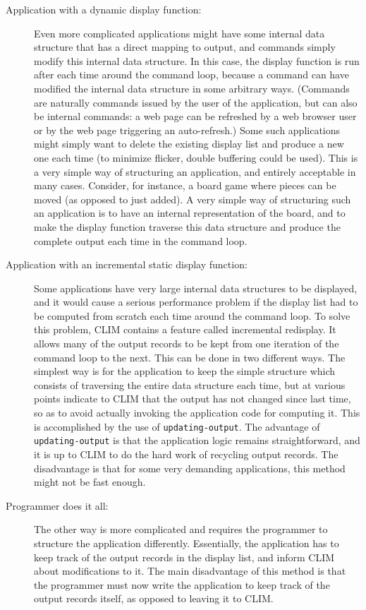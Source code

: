 \begin{description}
  \item[Application with a dynamic display function:] Even more
    complicated applications might have some internal data structure
    that has a direct mapping to output, and commands simply modify
    this internal data structure.  In this case, the display function
    is run after each time around the command loop, because a command
    can have modified the internal data structure in some arbitrary
    ways.  (Commands are naturally commands issued by the user of the
    application, but can also be internal commands: a web page can be
    refreshed by a web browser user or by the web page triggering an
    auto-refresh.) Some such applications might simply want to delete
    the existing display list and produce a new one each time (to
    minimize flicker, double buffering could be used).  This is a very
    simple way of structuring an application, and entirely acceptable
    in many cases.  Consider, for instance, a board game where pieces
    can be moved (as opposed to just added).  A very simple way of
    structuring such an application is to have an internal
    representation of the board, and to make the display function
    traverse this data structure and produce the complete output each
    time in the command loop.

  \item[Application with an incremental static display function:] Some
    applications have very large internal data structures to be
    displayed, and it would cause a serious performance problem if the
    display list had to be computed from scratch each time around the
    command loop.  To solve this problem, CLIM contains a feature
    called incremental redisplay.  It allows many of the output
    records to be kept from one iteration of the command loop to the
    next.  This can be done in two different ways.  The simplest way
    is for the application to keep the simple structure which consists
    of traversing the entire data structure each time, but at various
    points indicate to CLIM that the output has not changed since last
    time, so as to avoid actually invoking the application code for
    computing it.  This is accomplished by the use of
    \texttt{updating-output}.  The advantage of
    \texttt{updating-output} is that the application logic remains
    straightforward, and it is up to CLIM to do the hard work of
    recycling output records.  The disadvantage is that for some very
    demanding applications, this method might not be fast enough.

  \item[Programmer does it all:] The other way is more complicated and
    requires the programmer to structure the application differently.
    Essentially, the application has to keep track of the output
    records in the display list, and inform CLIM about modifications
    to it.  The main disadvantage of this method is that the
    programmer must now write the application to keep track of the
    output records itself, as opposed to leaving it to CLIM.

\end{description}


